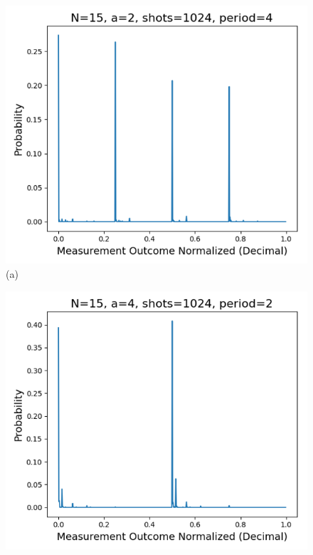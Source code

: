 \documentclass[conference,twoside]{IEEEtran}
\begin{document}
\begin{figure}[!htbp]
    \centering
    \begin{minipage}{0.3\textwidth}
        \centering
        \includegraphics[width=\linewidth]{prob_dist_N15_a2_backend_aersim.png}
        \label{fig:first}
        \small (a)
    \end{minipage}\hspace{0.03\textwidth}
    \begin{minipage}{0.3\textwidth}
        \centering
        \includegraphics[width=\linewidth]{prob_dist_N15_a4_backend_aersim.png}

\end{minipage}
\end{figure}
\end{document}
